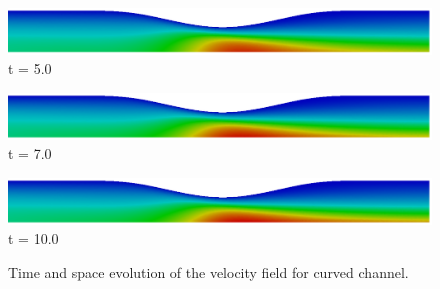 \begin{figure}[H]
     \begin{minipage}{.50\linewidth}
      \centering
      \includegraphics[scale=0.175]{./02_chaps/cap_solution/figure/vel_Curved10000.png}\\
      t = 5.0
     \end{minipage}
     \begin{minipage}{.50\linewidth}
     \medskip
      \centering
      \includegraphics[scale=0.175]{./02_chaps/cap_solution/figure/vel_Curved14000.png}\\
      t = 7.0
     \end{minipage}%
     \begin{minipage}{.50\linewidth}
     \medskip
      \centering
      \includegraphics[scale=0.175]{./02_chaps/cap_solution/figure/vel_Curved20000.png}\\
      t = 10.0
     \end{minipage}
     \medskip
     \caption{Time and space evolution of the velocity field for curved channel.}
     \label{velocity field curved}
\end{figure}

\newpage
